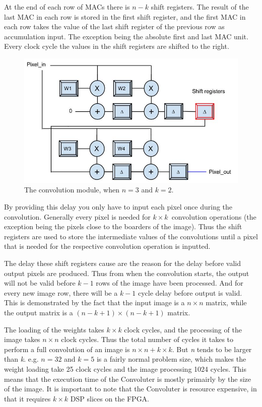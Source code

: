 At the end of each row of MACs there is $ n - k $ shift registers. The result of the last MAC in each row is stored in the first shift register, and the first MAC in each row takes the value of the last shift register of the previous row as accumulation input. The exception being the absolute first and last MAC unit. Every clock cycle the values in the shift registers are shifted to the right. 

\begin{figure}[h!]
  \centering
      \includegraphics[width=1.0\textwidth]{Figures/Method/Convolver}
  \caption{The convolution module, when $ n = 3 $ and $ k = 2 $.}
\end{figure}
	
By providing this delay you only have to input each pixel once during the convolution. Generally every pixel is needed for $ k \times k $ convolution operations (the exception being the pixels close to the boarders of the image). Thus the shift registers are used to store the intermediate values of the convolutions until a pixel that is needed for the respective convolution operation is inputted. 

The delay these shift registers cause are the reason for the delay before valid output pixels are produced. Thus from when the convolution starts, the output will not be valid before $ k-1 $ rows of the image have been processed. And for every new image row, there will be a $ k-1 $ cycle delay before output is valid. This is demonstrated by the fact that the input image is a $ n \times n $ matrix, while the output matrix is a $ (n-k+1) \times (n-k+1) $ matrix. 

The loading of the weights takes $ k \times k $ clock cycles, and the processing of the image takes $ n \times n $ clock cycles. Thus the total number of cycles it takes to perform a full convolution of an image is $ n \times n + k \times k $. But \textit{n} tends to be larger than \textit{k}. e.g. $ n = 32 $ and $ k = 5 $ is a fairly normal problem size, which makes the weight loading take 25 clock cycles and the image processing 1024 cycles. This means that the execution time of the Convoluter is mostly primairly by the size of the image. It is important to note that the Convoluter is resource expensive, in that it requires $ k \times k $ DSP slices on the FPGA.

